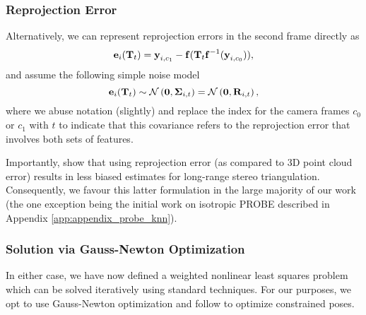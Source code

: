 \subsubsection{Reprojection Error}
\label{sec:vo_reprojection}
Alternatively, we can represent reprojection errors in the second frame directly as
\begin{equation}
  \boldsymbol{\mathbf{e}}_{i}(\boldsymbol{\mathbf{T}}_t)  = \boldsymbol{\mathbf{y}}_{i, c_1} - \boldsymbol{\mathbf{f}}( \boldsymbol{\mathbf{T}}_t 
    \boldsymbol{\mathbf{f}}^{-1}( \boldsymbol{\mathbf{y}}_{i, c_0} ) ),
   \label{eq:image_error}
\end{equation}
\noindent and assume the following simple noise model
 \begin{equation}
  \boldsymbol{\mathbf{e}}_{i}(\boldsymbol{\mathbf{T}}_t) \sim \mathcal{N}\left(\boldsymbol{\mathbf{0}}, \boldsymbol{\mathbf{\Sigma}}_{i,t} \right) = 
 \mathcal{N}\left(\boldsymbol{\mathbf{0}},  \boldsymbol{\mathbf{R}}_{i,t}\right), 
\end{equation}
where we abuse notation (slightly) and replace the index for the camera frames $c_0$ or $c_1$ with $t$ to indicate that this covariance refers to the reprojection error that involves both sets of features. 

Importantly, \cite{Sibley2007} show that using reprojection error (as compared to 3D point cloud error) results in less biased estimates for long-range stereo triangulation. Consequently, we favour this latter formulation in the large majority of our work (the one exception being the initial work on isotropic PROBE described in Appendix \ref{app:appendix_probe_knn}).

\subsubsection{Solution via Gauss-Newton Optimization}
\label{sec:vo_gauss_newton}
 In either case, we have now defined a weighted nonlinear least squares problem which can be solved iteratively using
standard techniques. For our purposes, we opt to use Gauss-Newton optimization and follow \cite{Barfoot2017-ri} to optimize constrained poses.

